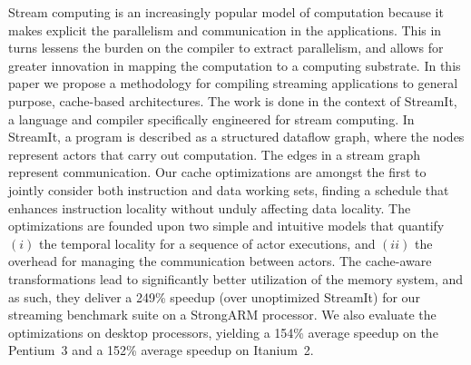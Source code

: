 
Stream computing is an increasingly popular model of computation
because it makes explicit the parallelism and communication in the
applications. This in turns lessens the burden on the compiler to
extract parallelism, and allows for greater innovation in mapping the
computation to a computing substrate. In this paper we propose a
methodology for compiling streaming applications to general purpose,
cache-based architectures. The work is done in the context of
StreamIt, a language and compiler specifically engineered for stream
computing. In StreamIt, a program is described as a structured dataflow
graph, where the nodes represent actors that carry out 
computation. The edges in a stream graph represent
communication. Our cache optimizations are amongst the first to 
jointly consider both instruction and data working sets, finding 
a schedule that enhances instruction locality without unduly
affecting data locality.  The
optimizations are founded upon two simple and intuitive models that
quantify $(i)$ the temporal locality for a sequence of  actor
executions, and $(ii)$ the overhead for managing the communication
between actors. The cache-aware transformations lead to significantly
better utilization of the memory system, and as such, they deliver
a 249\% speedup (over unoptimized StreamIt) for our streaming benchmark 
suite on a StrongARM processor.  We also evaluate the optimizations on 
desktop processors, yielding a 154\% average speedup on the Pentium~3 
and a 152\% average speedup on Itanium~2.
